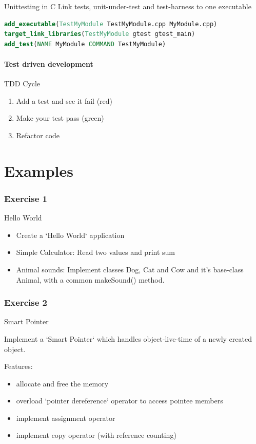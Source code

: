 \documentclass{beamer}
\begin{document}
\begin{frame}[fragile]{Unittesting in C}
Link tests, unit-under-test and test-harness to one executable
\begin{lstlisting}[language=cmake,caption=a unit test in cmake]
add_executable(TestMyModule TestMyModule.cpp MyModule.cpp)
target_link_libraries(TestMyModule gtest gtest_main)
add_test(NAME MyModule COMMAND TestMyModule)
\end{lstlisting}
\end{frame}

\subsection{Test driven development}

\begin{frame}{TDD Cycle}
\begin{enumerate}
  \item Add a test and see it fail (red)
  \item Make your test pass (green)
  \item Refactor code
\end{enumerate}
\end{frame}


\part{Examples}

\section{Exercise 1}
\begin{frame}{Hello World}
\begin{itemize}
  \item Create a `Hello World` application
  \item Simple Calculator: Read two values and print sum
  \item Animal sounds: Implement classes Dog, Cat and Cow and it's base-class
  Animal, with a common makeSound() method.
\end{itemize}
\end{frame}

\section{Exercise 2}

\begin{frame}{Smart Pointer}
\subtitle{}
Implement a `Smart Pointer` which handles object-live-time of a newly created
object.
\par
Features:
\begin{itemize}
  \item allocate and free the memory
  \item overload `pointer dereference` operator to access pointee members
  \item implement assignment operator
  \item implement copy operator (with reference counting)
\end{itemize}

\end{frame}
\end{document}
